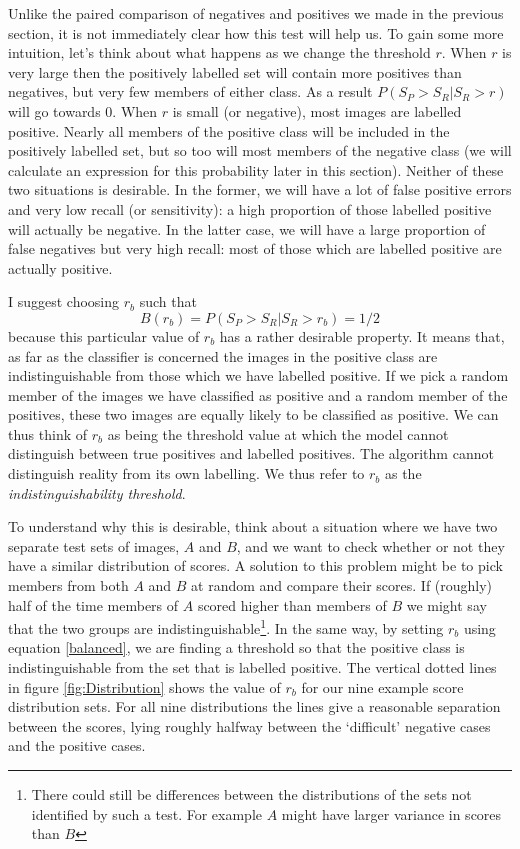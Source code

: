 \documentclass{article}
\begin{document}
Unlike the paired comparison of negatives and positives we made in the previous section, it is not immediately clear how this test will help us. To gain some more intuition, let's think about what happens as we change the threshold $r$. When $r$ is very large then the positively labelled set will contain more positives than negatives, but very few members of either class. As a result $P(S_P>S_R | S_R>r)$ will go towards $0$. When $r$ is small (or negative), most images are labelled positive. Nearly all members of the positive class will be included in the positively labelled set, but so too will most members of the negative class (we will calculate an expression for this probability later in this section). Neither of these two situations is desirable. In the former, we will have a lot of false positive errors and very low recall (or sensitivity): a high proportion of those labelled positive will actually be negative. In the latter case, we will have a large proportion of false negatives but very high recall: most of those which are labelled positive are actually positive.

I suggest choosing $r_b$ such that
 \begin{equation}
B(r_b) = P(S_P>S_R | S_R>r_b) = 1/2 \label{balanced}
\end{equation}
because this particular value of $r_b$ has a rather desirable property. It means that, as far as the classifier is concerned the images in the positive class are indistinguishable from those which we have labelled positive. If we pick a random member of the images we have classified as positive and a random member of the positives, these two images are equally likely to be classified as positive. We can thus think of $r_b$ as being the threshold value at which the model cannot distinguish between true positives and labelled positives. The algorithm cannot distinguish reality from its own labelling. We thus refer to $r_b$ as the {\it indistinguishability threshold}.

To understand why this is desirable, think about a situation where we have two separate test sets of images, $A$ and $B$, and we want to check whether or not they have a similar distribution of scores. A solution to this problem might be to pick members from both $A$ and $B$ at random and compare their scores. If (roughly) half of the time members of $A$ scored higher than members of $B$ we might say that the two groups are indistinguishable\footnote{There could still be differences between the distributions of the sets not identified by such a test. For example $A$ might have larger variance in scores than $B$}.  In the same way,  by setting $r_b$ using equation \ref{balanced}, we are finding a threshold so that the positive class is indistinguishable from the set that is labelled positive. The vertical dotted lines in figure \ref{fig:Distribution} shows the value of $r_b$ for our nine example score distribution sets. For all nine distributions the lines give a reasonable separation between the scores, lying roughly halfway between the `difficult' negative cases and the positive cases. 
\end{document}
